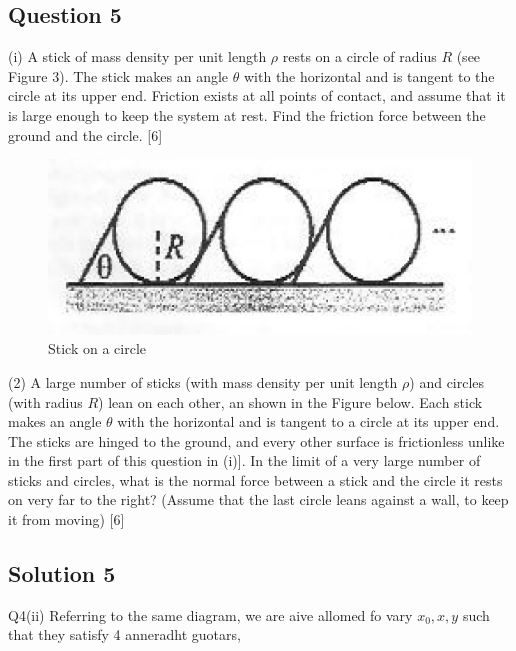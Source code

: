 \documentclass{article}
\begin{document}
\subsection{Question 5}

(i) A stick of mass density per unit length $\rho$ rests on a circle of radius $R$ (see Figure 3). The stick makes an angle $\theta$ with the horizontal and is tangent to the circle at its upper end. Friction exists at all points of contact, and assume that it is large enough to keep the system at rest. Find the friction force between the ground and the circle. [6]

\begin{figure}
	\centering
	\includegraphics[width=0.7\linewidth]{spho_book_TYS_images/2011q5.png}
	\caption{Stick on a circle}
\end{figure}
(2) A large number of sticks (with mass density per unit length $\rho$) and circles (with radius $R$) lean on each other, an shown in the Figure below. Each stick makes an angle $\theta$ with the horizontal and is tangent to a circle at its upper end. The sticks are hinged to the ground, and every other surface is frictionless unlike in the first part of this question in (i)]. In the limit of a very large number of sticks and circles, what is the normal force between a stick and the circle it rests on very far to the right? (Assume that the last circle leans against a wall, to keep it from moving) [6]


\subsection{Solution 5}
Q4(ii) Referring to the same diagram, we are aive allomed fo vary $x_{0}, x, y$ such that they satisfy 4 anneradht guotars,
\end{document}
